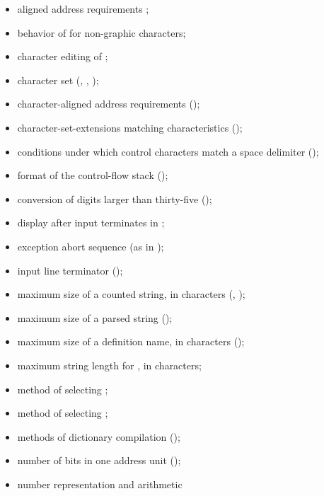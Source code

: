\begin{itemize}
\item aligned address requirements ;
%
\item behavior of  for non-graphic characters;
%
\item character editing of ;
%
\item character set (,
	, );
%
\item character-aligned address requirements
	();
%
\item character-set-extensions matching characteristics
	();
%
\item conditions under which control characters match a space
	delimiter ();
%
\item format of the control-flow stack
	();
%
\item conversion of digits larger than thirty-five
	();
%
\item display after input terminates in ;
%
\item exception abort sequence (as in );
%
\item input line terminator ();
%
\item maximum size of a counted string, in characters
	(, );
%
\item maximum size of a parsed string
	();
%
\item maximum size of a definition name, in characters
	();
%
\item maximum string length for
	, in characters;
%
\item method of selecting ;
%
\item method of selecting ;
%
\item methods of dictionary compilation
	();
%
\item number of bits in one address unit
	();
%
\item number representation and arithmetic

\end{itemize}
